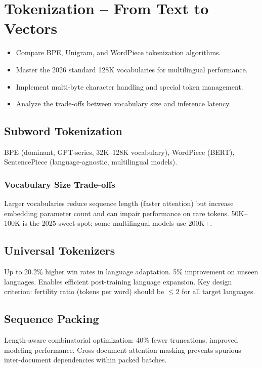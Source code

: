 \chapter{Tokenization -- From Text to Vectors}
\minitoc

\begin{chapteroverview}
  \begin{itemize}
    \item Compare BPE, Unigram, and WordPiece tokenization algorithms.
    \item Master the 2026 standard 128K vocabularies for multilingual performance.
    \item Implement multi-byte character handling and special token management.
    \item Analyze the trade-offs between vocabulary size and inference latency.
  \end{itemize}
\end{chapteroverview}

\section{Subword Tokenization}

BPE \parencite{sennrich2016neural} (dominant, GPT-series, 32K--128K vocabulary), WordPiece (BERT), SentencePiece \parencite{kudo2018sentencepiece} (language-agnostic, multilingual models).

\subsection{Vocabulary Size Trade-offs}

Larger vocabularies reduce sequence length (faster attention) but increase embedding parameter count and can impair performance on rare tokens. 50K--100K is the 2025 sweet spot; some multilingual models use 200K+.

\section{Universal Tokenizers}

Up to 20.2\% higher win rates in language adaptation. 5\% improvement on unseen languages. Enables efficient post-training language expansion. Key design criterion: fertility ratio (tokens per word) should be $\leq 2$ for all target languages.

\section{Sequence Packing}

Length-aware combinatorial optimization: 40\% fewer truncations, improved modeling performance. Cross-document attention masking prevents spurious inter-document dependencies within packed batches.
